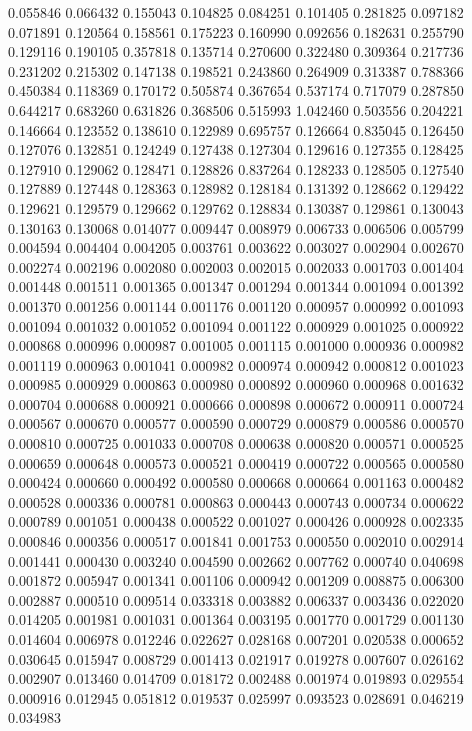 0.055846
0.066432
0.155043
0.104825
0.084251
0.101405
0.281825
0.097182
0.071891
0.120564
0.158561
0.175223
0.160990
0.092656
0.182631
0.255790
0.129116
0.190105
0.357818
0.135714
0.270600
0.322480
0.309364
0.217736
0.231202
0.215302
0.147138
0.198521
0.243860
0.264909
0.313387
0.788366
0.450384
0.118369
0.170172
0.505874
0.367654
0.537174
0.717079
0.287850
0.644217
0.683260
0.631826
0.368506
0.515993
1.042460
0.503556
0.204221
0.146664
0.123552
0.138610
0.122989
0.695757
0.126664
0.835045
0.126450
0.127076
0.132851
0.124249
0.127438
0.127304
0.129616
0.127355
0.128425
0.127910
0.129062
0.128471
0.128826
0.837264
0.128233
0.128505
0.127540
0.127889
0.127448
0.128363
0.128982
0.128184
0.131392
0.128662
0.129422
0.129621
0.129579
0.129662
0.129762
0.128834
0.130387
0.129861
0.130043
0.130163
0.130068
0.014077
0.009447
0.008979
0.006733
0.006506
0.005799
0.004594
0.004404
0.004205
0.003761
0.003622
0.003027
0.002904
0.002670
0.002274
0.002196
0.002080
0.002003
0.002015
0.002033
0.001703
0.001404
0.001448
0.001511
0.001365
0.001347
0.001294
0.001344
0.001094
0.001392
0.001370
0.001256
0.001144
0.001176
0.001120
0.000957
0.000992
0.001093
0.001094
0.001032
0.001052
0.001094
0.001122
0.000929
0.001025
0.000922
0.000868
0.000996
0.000987
0.001005
0.001115
0.001000
0.000936
0.000982
0.001119
0.000963
0.001041
0.000982
0.000974
0.000942
0.000812
0.001023
0.000985
0.000929
0.000863
0.000980
0.000892
0.000960
0.000968
0.001632
0.000704
0.000688
0.000921
0.000666
0.000898
0.000672
0.000911
0.000724
0.000567
0.000670
0.000577
0.000590
0.000729
0.000879
0.000586
0.000570
0.000810
0.000725
0.001033
0.000708
0.000638
0.000820
0.000571
0.000525
0.000659
0.000648
0.000573
0.000521
0.000419
0.000722
0.000565
0.000580
0.000424
0.000660
0.000492
0.000580
0.000668
0.000664
0.001163
0.000482
0.000528
0.000336
0.000781
0.000863
0.000443
0.000743
0.000734
0.000622
0.000789
0.001051
0.000438
0.000522
0.001027
0.000426
0.000928
0.002335
0.000846
0.000356
0.000517
0.001841
0.001753
0.000550
0.002010
0.002914
0.001441
0.000430
0.003240
0.004590
0.002662
0.007762
0.000740
0.040698
0.001872
0.005947
0.001341
0.001106
0.000942
0.001209
0.008875
0.006300
0.002887
0.000510
0.009514
0.033318
0.003882
0.006337
0.003436
0.022020
0.014205
0.001981
0.001031
0.001364
0.003195
0.001770
0.001729
0.001130
0.014604
0.006978
0.012246
0.022627
0.028168
0.007201
0.020538
0.000652
0.030645
0.015947
0.008729
0.001413
0.021917
0.019278
0.007607
0.026162
0.002907
0.013460
0.014709
0.018172
0.002488
0.001974
0.019893
0.029554
0.000916
0.012945
0.051812
0.019537
0.025997
0.093523
0.028691
0.046219
0.034983
